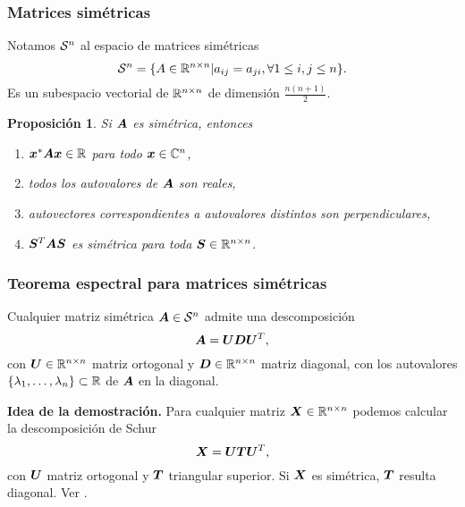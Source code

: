 \documentclass[aspectratio=169,12pt,spanish]{beamer}
\newtheorem{proposition}[theorem]{Proposición}
\begin{document}

\begin{frame}
\frametitle{Matrices simétricas}

Notamos ${\mathcal S}^n$ al espacio de matrices simétricas
$$
{\mathcal S}^n = \{A \in \mathbb{R}^{n \times n} | a_{ij} = a_{ji}, \forall 1 \le i, j \le n\}.
$$
Es un subespacio vectorial de $\mathbb{R}^{n \times n}$ de dimensión $\frac{n(n+1)}{2}$.

\begin{proposition}
Si $\bm{A}$ es simétrica, entonces
\begin{enumerate}
\item $\bm{x}^* \bm{A} \bm{x} \in \mathbb{R}$ para todo $\bm{x} \in \mathbb{C}^n$,
\item \label{item:realav} todos los autovalores de $\bm{A}$ son reales,
\item autovectores correspondientes a autovalores distintos son perpendiculares,
\item $\bm{S}^T \bm{A} \bm{S}$ es simétrica para toda $\bm{S} \in \mathbb{R}^{n\times n}$.
\end{enumerate}
\end{proposition}


\end{frame}


\begin{frame}
\frametitle{Teorema espectral para matrices simétricas}

\begin{theorem}
Cualquier matriz simétrica $\bm{A} \in {\mathcal S^n}$ admite una descomposición
$$
\bm{A} = \bm{U} \bm{D} \bm{U}^T,
$$
con $\bm{U} \in \mathbb{R}^{n\times n}$ matriz ortogonal y $\bm{D} \in \mathbb{R}^{n\times n}$ matriz diagonal, con los autovalores $\{\lambda_1, \dots, \lambda_n\} \subset \mathbb{R}$ de $\bm{A}$ en la diagonal.
\end{theorem}

\textbf{Idea de la demostración.} Para cualquier matriz $\bm{X} \in \mathbb{R}^{n\times n}$ podemos calcular la descomposición de Schur
$$
\bm{X} = \bm{U} \bm{T} \bm{U}^T,
$$
con $\bm{U}$ matriz ortogonal y $\bm{T}$ triangular superior. Si $\bm{X}$ es simétrica, $\bm{T}$ resulta diagonal.
Ver \cite[Teorema 4.1.5]{Horn1985}.


\end{frame}

\end{document}

